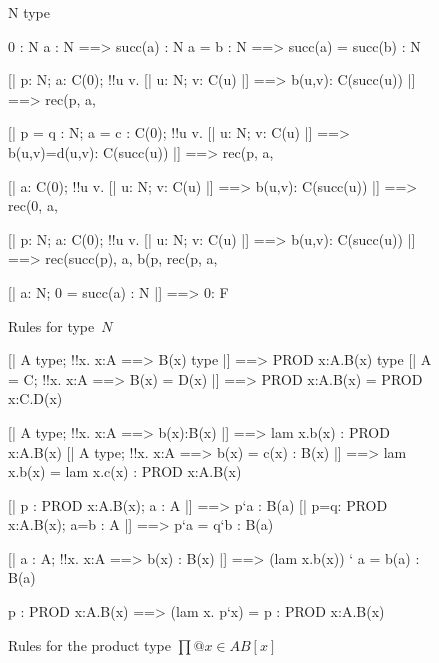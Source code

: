 \begin{figure} 
\begin{ttbox}
        N type

       0 : N
   a : N ==> succ(a) : N
  a = b : N ==> succ(a) = succ(b) : N

        [| p: N;  a: C(0);  
             !!u v. [| u: N; v: C(u) |] ==> b(u,v): C(succ(u)) 
          |] ==> rec(p, a, %

       [| p = q : N;  a = c : C(0);  
             !!u v. [| u: N; v: C(u) |] ==> b(u,v)=d(u,v): C(succ(u))
          |] ==> rec(p, a, %

       [| a: C(0);  
             !!u v. [| u: N; v: C(u) |] ==> b(u,v): C(succ(u))
          |] ==> rec(0, a, %

   [| p: N;  a: C(0);  
             !!u v. [| u: N; v: C(u) |] ==> b(u,v): C(succ(u)) 
          |] ==> rec(succ(p), a, %
                 b(p, rec(p, a, %

      [| a: N;  0 = succ(a) : N |] ==> 0: F
\end{ttbox}
\caption{Rules for type~$N$} \label{ctt-N}
\end{figure}


\begin{figure} 
\begin{ttbox}
     [| A type; !!x. x:A ==> B(x) type |] ==> PROD x:A.B(x) type
    [| A = C;  !!x. x:A ==> B(x) = D(x) |] ==> 
          PROD x:A.B(x) = PROD x:C.D(x)

     [| A type;  !!x. x:A ==> b(x):B(x)
          |] ==> lam x.b(x) : PROD x:A.B(x)
    [| A type;  !!x. x:A ==> b(x) = c(x) : B(x)
          |] ==> lam x.b(x) = lam x.c(x) : PROD x:A.B(x)

     [| p : PROD x:A.B(x);  a : A |] ==> p`a : B(a)
    [| p=q: PROD x:A.B(x);  a=b : A |] ==> p`a = q`b : B(a)

     [| a : A;  !!x. x:A ==> b(x) : B(x)
          |] ==> (lam x.b(x)) ` a = b(a) : B(a)

    p : PROD x:A.B(x) ==> (lam x. p`x) = p : PROD x:A.B(x)
\end{ttbox}
\caption{Rules for the product type $\prod@{x\in A}B[x]$} \label{ctt-prod}
\end{figure}



